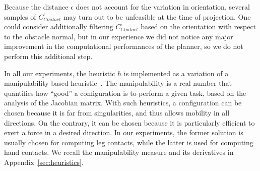 \documentclass[journal]{IEEEtran}
\providecommand{\DIFaddtex}[1]{#1} %
\providecommand{\DIFdeltex}[1]{} %
\providecommand{\DIFaddbegin}{\protect\color{blue}} %
\providecommand{\DIFaddend}{\protect\color{black}} %
\providecommand{\DIFdelbegin}{\protect\cbdelete} %
\providecommand{\DIFdelend}{} %
\providecommand{\DIFadd}[1]{\texorpdfstring{\DIFaddtex{#1}}{#1}} %
\providecommand{\DIFdel}[1]{\texorpdfstring{\DIFdeltex{#1}}{}} %
\begin{document}
\DIFdelbegin \DIFdel{The reader is referred to our previous work for an extensive discussion on the benefits of this approach, and the optimal choice 
of the parameter $N$~\citep{Tonneau2014}.
Our criterion to assert efficiently the static equilibrium of the robot, as well as the heuristics $h$ are detailed inAppendix~\ref{sec:heuristics}.
}\DIFdelend %
\DIFaddbegin \DIFadd{Because the distance $\epsilon$ does not account for the variation in orientation, several samples of $ C_{Contact}^{\epsilon}$  may turn out to be unfeasible at the time of projection. One could consider additionally filtering $ C_{Contact}^{\epsilon}$ based on the orientation with respect to the obstacle normal, but in our experience we did not notice
any major improvement in the computational performances of the planner, so we do not perform this additional step. 
 }\DIFaddend 

\DIFaddbegin \DIFadd{In all our experiments, the heuristic $h$ is implemented as a variation of a manipulability-based heuristic~\cite{Yoshikawa1984}. The manipulability is a real number that quantifies how 
``good'' a configuration is to perform a given task, based on the analysis of the Jacobian matrix. With such heuristics, a configuration can be chosen because it is far from singularities, and thus allows mobility in all directions. On the contrary, it can be chosen because it is particularly efficient to exert a force in a desired direction. In our experiments, the former solution is usually chosen for computing leg contacts, while the latter is used for computing hand contacts. We recall the manipulability measure and its derivatives in Appendix~\ref{sec:heuristics}.
}\DIFaddend 
\end{document}
